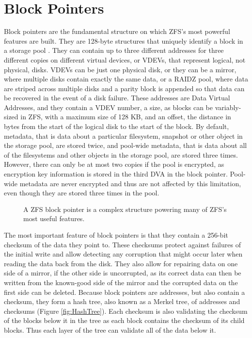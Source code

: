 \section{Block Pointers}
Block pointers are the fundamental structure on which ZFS's most powerful features are built. 
They are 128-byte structures that uniquely identify a block in a storage pool
\cite{ahrens_openzfs_basics,ahrens_read_write,mckusick_zfs_2015_presentation}. 
They can contain up to three different addresses for three different copies on different virtual devices, or VDEVs,
that represent logical, not physical, disks.
VDEVs can be just one physical disk, 
or they can be a mirror, where multiple disks contain exactly the same data,
or a RAIDZ pool,  where data are striped across multiple disks and a parity block is appended 
so that data can be recovered in the event of a disk failure.
These addresses are Data Virtual Addresses, and they contain a VDEV number, a size, as blocks can be variably-sized in ZFS, 
with a maximum size of 128 KB, and an offset, the distance in bytes from the start of the logical disk to the start of the block.
By default, metadata, that is data about a particular filesystem, snapshot or other object in the storage pool, are stored twice,
and pool-wide metadata, that is data about all of the filesystems and other objects in the storage pool, are stored three times.
However, there can only be at most two copies if the pool is encrypted, as encryption key information is stored in the third DVA in the block pointer. 
Pool-wide metadata are never encrypted and thus are not affected by this limitation, even though they are stored three times in the pool.

\begin{figure}[H]
    \centering
    \resizebox{0.75\linewidth}{!}{}
    \captionsetup{width=0.75\linewidth}
    \caption{A ZFS block pointer is a complex structure powering many of ZFS's most useful features\cite{ahrens_openzfs_basics}.}
\label{fig:BlockPointer}
\end{figure}

The most important feature of block pointers is that they contain a 256-bit checksum of the data they point to.
These checksums protect against failures of the initial write and allow detecting any corruption that might occur later
when reading the data back from the disk.
They also allow for repairing data on one side of a mirror, if the other side is uncorrupted, 
as its correct data can then be written from the known-good side of the mirror and the corrupted data on the first side 
can be deleted.
Because block pointers are addresses, but also contain a checksum, they form a hash tree, also known as a Merkel tree, of addresses and checksums
(Figure \ref{fig:HashTree}).
Each checksum is also validating the checksum of the blocks below it in the tree as each block contains the checksum of
its child blocks.
Thus each layer of the tree can validate all of the data below it.

